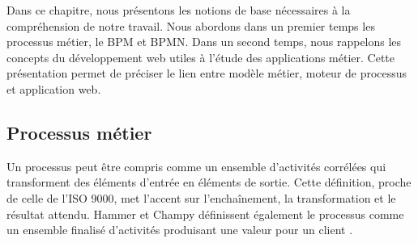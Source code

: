 ﻿
\label{chap:services_composition_generalities}


Dans ce chapitre, nous présentons les notions de base nécessaires à la
compréhension de notre travail. Nous abordons dans un premier temps les processus
métier, le BPM et BPMN. Dans un second temps, nous rappelons les concepts du
développement web utiles à l'étude des applications métier. Cette
présentation permet de préciser le lien entre modèle métier, moteur de processus
et application web.

\label{sec:calcul_orientee_service}

\subsection{Processus métier}{}
\label{subsec:evolution_high_performance}

Un processus peut être compris comme un ensemble d'activités corrélées qui transforment des éléments d'entrée en éléments de sortie. Cette définition, proche de celle de l'ISO 9000, met l'accent sur l'enchaînement, la transformation et le résultat attendu. Hammer et Champy définissent également le processus comme un ensemble finalisé d'activités produisant une valeur pour un client \cite{hammer1993}.




